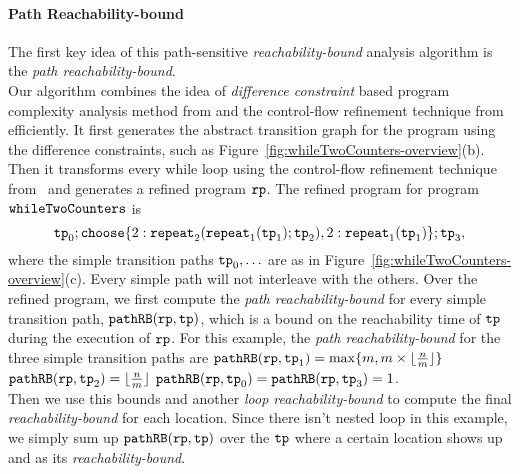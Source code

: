 \paragraph{Path Reachability-bound}
The first key idea of this path-sensitive \emph{reachability-bound} analysis algorithm is the \emph{path reachability-bound}.
\\
Our algorithm combines the idea of \emph{difference constraint} based program complexity analysis method from \cite{sinn2017complexity}
and the control-flow refinement technique from~\cite{GulwaniJK09} efficiently.
It first
generates the abstract transition graph for the program using the difference constraints, such as Figure~\ref{fig:whileTwoCounters-overview}(b).
Then it transforms every while loop using the control-flow refinement technique from~\cite{GulwaniJK09} and generates a refined program $\mathtt{rp}$.
% 
The refined program for program $\mathtt{whileTwoCounters}$ is
\[
  \tpath_0 ; 
  \rpchoose{2: \rprepeat_2(\rprepeat_1(\tpath_1); \tpath_2) , 
  2: \rprepeat_1(\tpath_1) }; \tpath_3,
\]
where the simple transition paths $\mathtt{tp}_0, \ldots$ are as in Figure~\ref{fig:whileTwoCounters-overview}(c).
Every simple path will not interleave with the others. 
Over the refined program, we first compute the \emph{path reachability-bound} for every simple transition path,
$\mathtt{pathRB}(\mathtt{rp}, \mathtt{tp})$,
which is a bound on the reachability time of $\mathtt{tp}$ during the execution of $\mathtt{rp}$.
For this example, the \emph{path reachability-bound} for the three simple transition paths are
$\mathtt{pathRB}(\mathtt{rp}, \mathtt{tp}_1) = \max\{m, m \times \lfloor\frac{n}{m}\rfloor\}$ \quad
$\mathtt{pathRB}(\mathtt{rp}, \mathtt{tp}_2) = \lfloor\frac{n}{m}\rfloor$ \quad
$\mathtt{pathRB}(\mathtt{rp}, \mathtt{tp}_0) = \mathtt{pathRB}(\mathtt{rp}, \mathtt{tp}_3) = 1$.
\\
Then we use this bounds
and another \emph{loop reachability-bound}
to compute the final \emph{reachability-bound} for each location.
Since there isn't nested loop in this example, we simply sum up $\mathtt{pathRB}(\mathtt{rp}, \mathtt{tp})$ over the $\mathtt{tp}$ where a certain location shows up
and as its \emph{reachability-bound}.
%
